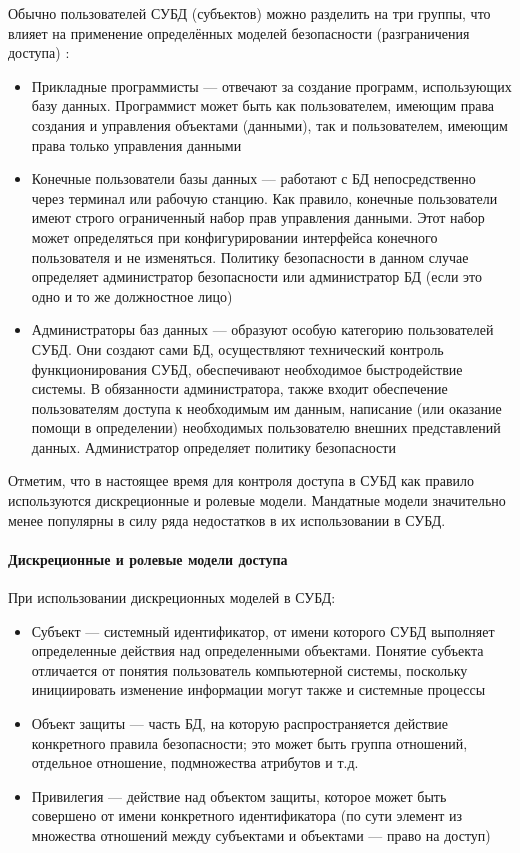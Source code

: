 Обычно пользователей СУБД (субъектов) можно разделить на три группы, что влияет на применение определённых
моделей безопасности (разграничения доступа) \autocite{CitForumSafeDB}:
\begin{itemize}
    \item Прикладные программисты --- отвечают за создание программ, использующих базу данных. Программист
    может быть как пользователем, имеющим права создания и управления объектами (данными), так и пользователем,
    имеющим права только управления данными

    \item Конечные пользователи базы данных --- работают с БД непосредственно через терминал или рабочую станцию.
    Как правило, конечные пользователи имеют строго ограниченный набор прав управления данными. Этот набор
    может определяться при конфигурировании интерфейса конечного пользователя и не изменяться. Политику
    безопасности в данном случае определяет администратор безопасности или администратор БД (если это одно и
    то же должностное лицо)

    \item Администраторы баз данных --- образуют особую категорию пользователей СУБД. Они создают сами БД,
    осуществляют технический контроль функционирования СУБД, обеспечивают необходимое быстродействие системы.
    В обязанности администратора, также входит обеспечение пользователям доступа к необходимым им данным,
    написание (или оказание помощи в определении) необходимых пользователю внешних представлений данных.
    Администратор определяет политику безопасности
\end{itemize}

Отметим, что в настоящее время для контроля доступа в СУБД как правило используются дискреционные и ролевые
модели. Мандатные модели значительно менее популярны в силу ряда недостатков в их использовании в СУБД.

\paragraph{Дискреционные и ролевые модели доступа}

При использовании дискреционных моделей в СУБД:
\begin{itemize}
    \item Субъект --- системный идентификатор, от имени которого СУБД выполняет определенные действия над
    определенными объектами. Понятие субъекта отличается от понятия пользователь компьютерной системы,
    поскольку инициировать изменение информации могут также и системные процессы
    \item Объект защиты --- часть БД, на которую распространяется действие конкретного правила безопасности;
    это может быть группа отношений, отдельное отношение, подмножества атрибутов и т.д.
    \item Привилегия --- действие над объектом защиты, которое может быть совершено от имени конкретного
    идентификатора (по сути элемент из множества отношений между субъектами и объектами --- право на доступ)
\end{itemize}

